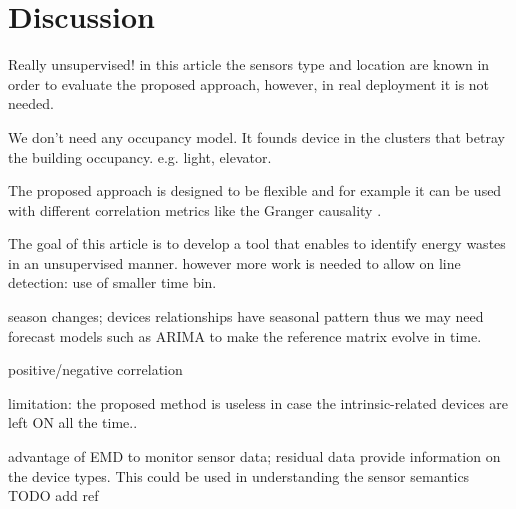 \section{Discussion}
Really unsupervised! in this article the sensors type and location are known in order to evaluate the proposed approach, however, in real deployment it is not needed.

We don't need any occupancy model. It founds device in the clusters that betray the building occupancy. e.g. light, elevator.

The proposed approach is designed to be flexible and for example it can be used with different correlation metrics like the Granger causality \cite{kim:buildsys2010}.

The goal of this article is to develop a tool that enables to identify energy wastes in an unsupervised manner.
however more work is needed to allow on line detection: use of smaller time bin.

season changes; devices relationships have seasonal pattern thus we may need forecast models such as ARIMA to make the reference matrix evolve in time.

positive/negative correlation

limitation: the proposed method is useless in case the intrinsic-related devices are left ON all the time..


advantage of EMD to monitor sensor data; residual data provide information on the device types.
This could be used in understanding the sensor semantics TODO add ref
